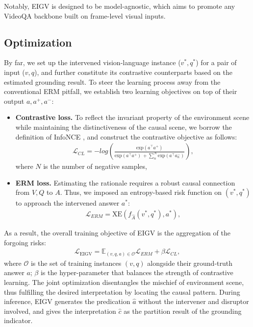 Notably, EIGV is designed to be model-agnostic, which aims to promote any VideoQA backbone built on frame-level visual inputs.
%




\subsection{Optimization}
By far, we set up the intervened vision-language instance ($v^*,q^*$) for a pair of input ($v,q$), and further constitute its contrastive counterparts based on the estimated grounding result. 
To steer the learning process away from the conventional ERM pitfall, we establish two learning objectives on top of their output $a, a^+, a^-$:

\begin{itemize}[leftmargin=*]
    \vspace{5pt}
    \item \noindent \textbf{Contrastive loss.} To reflect the invariant property of the environment scene while maintaining the distinctiveness of the causal scene, we borrow the definition of InfoNCE \cite{DBLP:journals/corr/abs-1807-03748}, and construct the contrastive objective as follows:
    \begin{gather}
        \mathcal{L}_{CL}=-log(\frac{\text{exp}{(a^\top a^+)}}{\text{exp}{(a^\top a^+)}\,+\sum_{n}^{N}\text{exp}{(a^\top a_n^-)}}),
    \end{gather}
    where $N$ is the number of negative samples,  
    
    \vspace{5pt}
    \item \noindent \textbf{ERM loss.} 
    Estimating the rationale requires a robust causal connection from $V,Q$ to $A$. Thus, we imposed an entropy-based risk function  on $(v^*,q^*)$ to approach the intervened answer $a^*$:
    \begin{gather}
        \mathcal{L}_{ERM}=\text{XE}(f_{\hat{A}}(v^*,q^*), a^*),
    \end{gather}
\end{itemize}

As a result, the overall training objective of EIGV is the aggregation of the forgoing risks:
\begin{gather}
   \mathcal{L}_{\text{EIGV}} = \mathbb{E}_{(v,q,a)\in\mathcal{O}}\mathcal{L}_{ERM} + \beta\mathcal{L}_{CL},
\end{gather}
where $\mathcal{O}$ is the set of training instances $(v,q)$ alongside their ground-truth answer $a$; $\beta$ is the hyper-parameter that balances the strength of contrastive learning. The joint optimization disentangles the mischief of environment scene, thus fulfilling the desired interpretation by locating the causal pattern. During inference, EIGV generates the predication $\hat{a}$ without the intervener and disruptor involved, and gives the interpretation $\hat{c}$ as the partition result of the grounding indicator.

